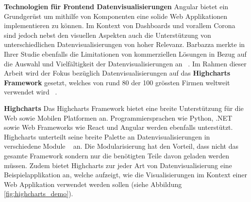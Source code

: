 \begin{table}[h]
\centering
{}
\caption{Gebräuchliche Angular CLI Befehle ~\citep{angular_cli}}
\label{table:tbl:angular_cli_commands}
\end{table}

\noindent
\textbf{Technologien für Frontend Datenvisualisierungen}
\newline
\indent
Angular bietet ein Grundgerüst um mithilfe von Komponenten eine solide Web Applikationen implementieren zu können. Im Kontext von Dashboards und vorallem Corona sind jedoch nebst den visuellen Aspekten auch die Unterstützung von unterschiedlichen Datenvisualisierungen von hoher Relevanz. Barbazza merkte in Ihrer Studie ebenfalls die Limitationen von kommerziellen Lösungen in Bezug auf die Auswahl und Vielfältigkeit der Datenvisualisierungen an ~\citep[S. 9]{barbazza}. Im Rahmen dieser Arbeit wird der Fokus bezüglich Datenvisualisierungen auf das \textbf{Highcharts Framework} gesetzt, welches von rund 80 der 100 grössten Firmen weltweit verwendet wird ~\citep{highcharts}.
\newline

\newpage
\noindent
\textbf{Highcharts}
\newline
\indent
Das Highcharts Framework bietet eine breite Unterstützung für die Web sowie Mobilen Platformen an. Programmiersprachen wie Python, .NET sowie Web Frameworks wie React und Angular werden ebenfalls unterstützt. Highcharts unterteilt seine breite Palette an Datenvisualisierungen in verschiedene Module ~\citep{highcharts} an. Die Modularisierung hat den Vorteil, dass nicht das gesamte Framework sondern nur die benötigten Teile davon geladen werden müssen. Zudem bietet Highcharts zur jeder Art von Datenvisualisierung eine Beispielapplikation an, welche aufzeigt, wie die Visualisierungen im Kontext einer Web Applikation verwendet werden sollen (siehe Abbildung \ref{fig:highcharts_demo}).

